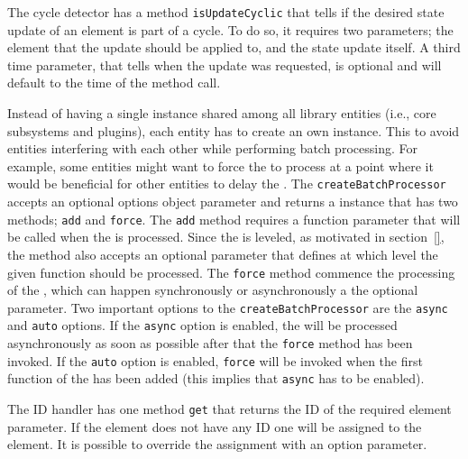 \documentclass[a4paper,11pt]{kth-mag}
\newcommand{\code}[1]{\texttt{#1}}
\newcommand\abbr[2][]{\uppercase{#2}\ifthenelse{\equal{#1}{}}%
                     {}{#1}}
\begin{document}
        The cycle detector has a method \code{isUpdateCyclic} that tells if the desired state update of an element is part of a cycle.
        To do so, it requires two parameters; the element that the update should be applied to, and the state update itself.
        A third time parameter, that tells when the update was requested, is optional and will default to the time of the method call.

        Instead of having a single  instance shared among all library entities (i.e., core subsystems and plugins), each entity has to create an own instance.
        This to avoid entities interfering with each other while performing \gls{batch processing}.
        For example, some entities might want to force the  to process at a point where it would be beneficial for other entities to delay the .
        The \code{createBatchProcessor} accepts an optional options object parameter and returns a  instance that has two methods; \code{add} and \code{force}.
        The \code{add} method requires a function parameter that will be called when the  is processed.
        Since the  is leveled, as motivated in section~\ref{}, the method also accepts an optional parameter that defines at which level the given function should be processed.
        The \code{force} method commence the processing of the , which can happen synchronously or asynchronously a the optional parameter.
        Two important options to the \code{createBatchProcessor} are the \code{async} and \code{auto} options.
        If the \code{async} option is enabled, the  will be processed asynchronously as soon as possible after that the \code{force} method has been invoked.
        If the \code{auto} option is enabled, \code{force} will be invoked when the first function of the  has been added (this implies that \code{async} has to be enabled).

        The \abbr{ID} handler has one method \code{get} that returns the \abbr{ID} of the required element parameter.
        If the element does not have any \abbr{ID} one will be assigned to the element.
        It is possible to override the assignment with an option parameter.

\end{document}
